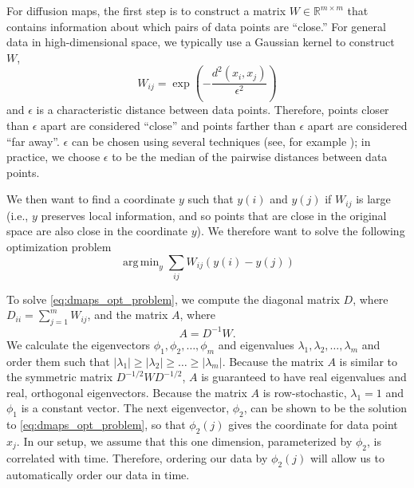 \documentclass{pnastwo}
\DeclareMathOperator*{\argmin}{arg\,min}
\begin{document}
\begin{article}
\begin{materials}
For diffusion maps, the first step is to construct a matrix $W \in \mathbb{R}^{m \times m}$ that contains information about which pairs of data points are ``close.''
%
For general data in high-dimensional space, we typically use a Gaussian kernel to construct $W$,
\begin{equation} \label{eq:dmaps_W}
W_{ij} = \exp \left( -\frac{d^2(x_i, x_j)}{\epsilon^2} \right)
\end{equation}
and $\epsilon$ is a characteristic distance between data points.
%
Therefore, points closer than $\epsilon$ apart are considered ``close'' and points farther than $\epsilon$ apart are considered ``far away''.
%
$\epsilon$ can be chosen using several techniques (see, for example \cite{coifman2008graph}); in practice, we choose $\epsilon$ to be the median of the pairwise distances between data points.

We then want to find a coordinate $y$ such that $y(i)$ and $y(j)$ if $W_{ij}$ is large (i.e., $y$ preserves local information, and so points that are close in the original space are also close in the coordinate $y$).
%
We therefore want to solve the following optimization problem \cite{Belkin2003}
\begin{equation} \label{eq:dmaps_opt_problem}
\argmin_{y} \sum_{ij} W_{ij} (y(i) - y(j))
\end{equation}
%

To solve \eqref{eq:dmaps_opt_problem}, we compute the diagonal matrix $D$, where $D_{ii} = \sum_{j=1}^{m} W_{ij}$, and the matrix $A$, where
\begin{equation} \label{eq:dmaps_A}
A = D^{-1} W.
\end{equation} 
%
We calculate the eigenvectors $\phi_1, \phi_2, \dots, \phi_m$ and eigenvalues $\lambda_1, \lambda_2, \dots, \lambda_m$ and order them such that $|\lambda_1| \ge |\lambda_2| \ge \dots \ge |\lambda_m|$.
%
Because the matrix $A$ is similar to the symmetric matrix $D^{-1/2} W D^{-1/2}$, $A$ is guaranteed to have real eigenvalues and real, orthogonal eigenvectors. 
%
Because the matrix $A$ is row-stochastic, $\lambda_1=1$ and $\phi_1$ is a constant vector.
%
%
The next eigenvector, $\phi_2$, can be shown to be the solution to \eqref{eq:dmaps_opt_problem}, so that $\phi_2(j)$ gives the coordinate for data point $x_j$.
%
In our setup, we assume that this one dimension, parameterized by $\phi_2$, is correlated with time.
%
Therefore, ordering our data by $\phi_2(j)$ will allow us to automatically order our data in time.


\end{materials}
\end{article}
\end{document}
